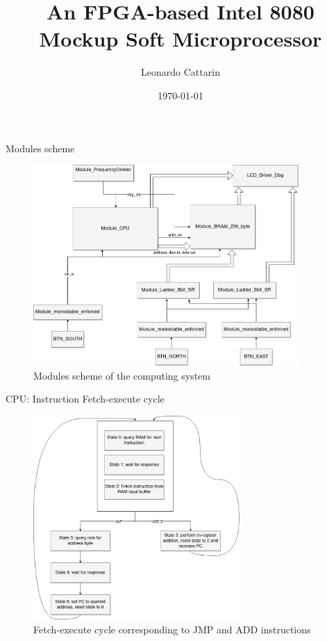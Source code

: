 \documentclass{beamer}
\title{An FPGA-based Intel 8080 Mockup Soft Microprocessor}
\date{\today}
\author{Leonardo Cattarin}
\institute{University of Trento}
\begin{document}
  \maketitle


  \begin{frame}{Modules scheme}
    \begin{figure}[hbtp]
      \centering
      \includegraphics[width=0.9\textwidth]{img/System.png}
      \caption{Modules scheme of the computing system}
      \label{fig:system}
  \end{figure}
  \end{frame}

  \begin{frame}{CPU: Instruction Fetch-execute cycle}
    \begin{figure}[hbtp]
      \centering
      \includegraphics[width=0.7\textwidth]{img/States.png}
      \caption{Fetch-execute cycle corresponding to JMP and ADD instructions}
      \label{fig:diagram}
  \end{figure}
  \end{frame}
\end{document}
